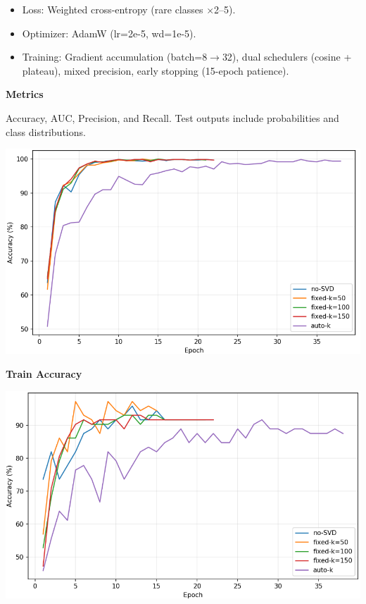 \documentclass[a1paper,portrait,margin=0.8cm]{baposter}
\begin{document}
\begin{poster}
{\begin{minipage}[b]{0.56\textwidth}
\begin{minipage}[b]{0.46\textwidth}
\begin{itemize}
    \item Loss: Weighted cross-entropy (rare classes $\times$2–5).
    \item Optimizer: AdamW (lr=2e-5, wd=1e-5).
    \item Training: Gradient accumulation (batch=8$\rightarrow$32), dual schedulers (cosine + plateau), mixed precision, early stopping (15-epoch patience).
\end{itemize}

\end{minipage}
\hfill
\begin{minipage}[b]{0.5\textwidth}

\vspace{0.5em}

\textbf{Metrics} 

Accuracy, AUC, Precision, and Recall. Test outputs include probabilities and class distributions.

\centering
\includegraphics[width=0.96\linewidth]{train accuracy.png}

\vspace{-0.3em}
\textbf{Train Accuracy }
\vspace{0.5em}

\includegraphics[width=0.96\linewidth]{validation accuracy.png}


\end{minipage}
\end{minipage}}
\end{poster}
\end{document}

